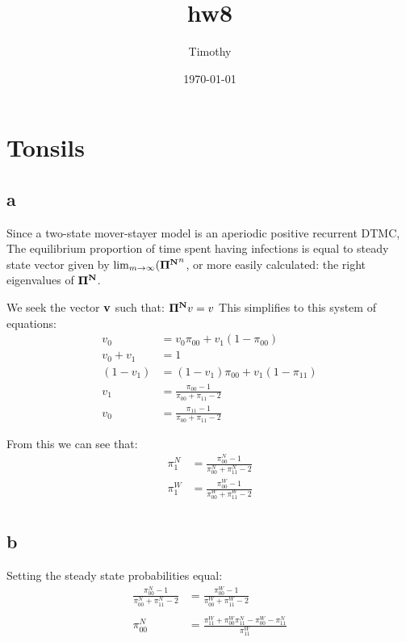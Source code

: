 \documentclass[11pt]{article}
\author{Timothy}
\date{\today}
\title{hw8}
\begin{document}
\maketitle
\tableofcontents

\section{Tonsils}
\label{sec-1}

\subsection{a}
\label{sec-1-1}
Since a two-state mover-stayer model is an aperiodic positive
recurrent DTMC, The equilibrium proportion of time spent having
infections is equal to steady state vector given by $\lim_{m \to \infty}
(\bold{\Pi^N}^n$, or more easily calculated: the right eigenvalues of
$\bold{\Pi^N}$.

We seek the vector $\bold{v}$ such that: $\bold{\Pi^N} v = v$
This simplifies to this system of equations:
\begin{align*}
v_0 &= v_0 \pi_{00} + v_1 (1-\pi_{00}) \\
v_0 + v_1 &= 1\\
(1-v_1) &= (1-v_1) \pi_{00} + v_1 (1 - \pi_{11} )\\ \hline
v_1 &= \frac{ \pi_{00} - 1 }{ \pi_{00} + \pi_{11} -2 }\\
v_0 &= \frac{ \pi_{11} - 1 }{ \pi_{00} + \pi_{11} -2 }
\end{align*}

From this we can see that:
\begin{align*}
\pi_1^N &= \frac{ \pi_{00}^N - 1 }{\pi_{00}^N + \pi_{11}^N - 2 }\\
\pi_1^W &= \frac{ \pi_{00}^W - 1 }{\pi_{00}^W + \pi_{11}^W - 2 }\\
\end{align*}

\subsection{b}
\label{sec-1-2}
Setting the steady state probabilities equal:
\begin{align*}
\frac{ \pi_{00}^N - 1 }{\pi_{00}^N + \pi_{11}^N - 2 } &= \frac{ \pi_{00}^W - 1 }{\pi_{00}^W + \pi_{11}^W -
2 }\\ \\
\pi_{00}^N  &= \frac{ \pi_{11}^W + \pi_{00}^W \pi_{11}^N - \pi_{00}^W - \pi_{11}^N }{ \pi_{11}^W }
\end{align*}
\end{document}
